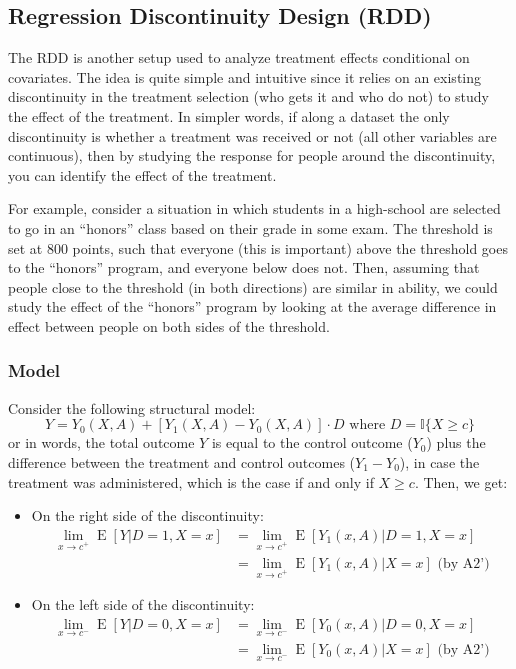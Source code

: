 \documentclass[12pt]{report}
\newcommand{\E}[1]{\operatorname{E}\left[#1\right]}
\begin{document}
\subsection{Regression Discontinuity Design (RDD)}

The RDD is another setup used to analyze treatment effects conditional on covariates. The idea is quite simple and intuitive since it relies on an existing discontinuity in the treatment selection (who gets it and who do not) to study the effect of the treatment. In simpler words, if along a dataset the only discontinuity is whether a treatment was received or not (all other variables are continuous), then by studying the response for people around the discontinuity, you can identify the effect of the treatment. 

For example, consider a situation in which students in a high-school are selected to go in an ``honors'' class based on their grade in some exam. The threshold is set at 800 points, such that everyone (this is important) above the threshold goes to the ``honors'' program, and everyone below does not. Then, assuming that people close to the threshold (in both directions) are similar in ability, we could study the effect of the ``honors'' program by looking at the average difference in effect between people on both sides of the threshold.

\subsubsection{Model}

Consider the following structural model: $$ Y = Y_0(X, A) + \left[Y_1(X, A) - Y_0(X, A)\right]\cdot D \text{ where } D = \mathbb{I}\{X \geq c\} $$ or in words, the total outcome $Y$ is equal to the control outcome ($Y_0$) plus the difference between the treatment and control outcomes ($Y_1 - Y_0$), in case the treatment was administered, which is the case if and only if $X\geq c$. Then, we get:\begin{itemize}
\item On the right side of the discontinuity: \begin{align*}
\lim_{x\to c^+} \E{Y\vert D=1, X=x} & = \lim_{x\to c^+} \E{Y_1(x, A)\vert D=1, X=x} \\ & = \lim_{x\to c^+} \E{Y_1(x, A)\vert X=x} \text{ (by A2')}
\end{align*}
\item On the left side of the discontinuity: \begin{align*}
\lim_{x\to c^-} \E{Y\vert D=0, X=x} & = \lim_{x\to c^-} \E{Y_0(x, A)\vert D=0, X=x} \\ & = \lim_{x\to c^-} \E{Y_0(x, A)\vert X=x} \text{ (by A2')}
\end{align*}
\end{itemize}
\end{document}
